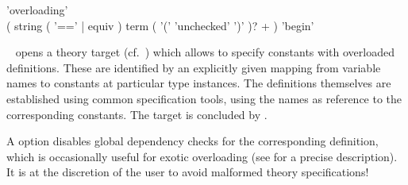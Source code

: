 \begin{isabellebody}
\begin{isamarkuptext}
  \begin{rail}
    'overloading' \\
    ( string ( '==' | equiv ) term ( '(' 'unchecked' ')' )? + ) 'begin'
  \end{rail}

  \begin{description}

  \item \hyperlink{command.overloading}{\mbox{}}~
  opens a theory target (cf.\ ) which allows to
  specify constants with overloaded definitions.  These are identified
  by an explicitly given mapping from variable names  to
  constants  at particular type instances.  The
  definitions themselves are established using common specification
  tools, using the names  as reference to the
  corresponding constants.  The target is concluded by \hyperlink{command.local.end}{\mbox{}}.

  A  option disables global dependency checks for
  the corresponding definition, which is occasionally useful for
  exotic overloading (see  for a precise description).
  It is at the discretion of the user to avoid
  malformed theory specifications!


\end{description}
\end{isamarkuptext}
\end{isabellebody}
